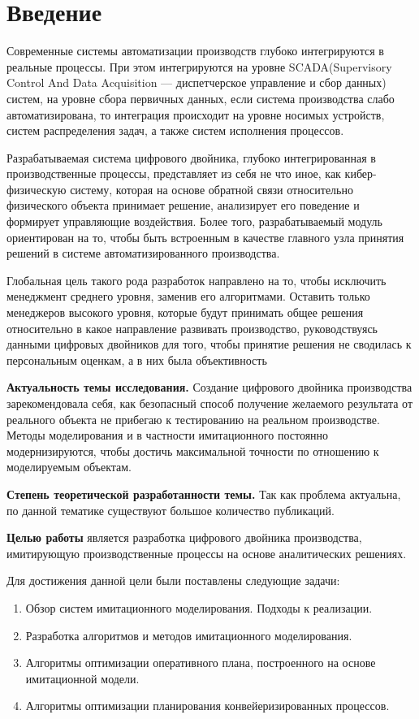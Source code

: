 \section*{Введение}
Современные системы автоматизации производств глубоко интегрируются в реальные процессы. При этом интегрируются на уровне SCADA(Supervisory Control And Data Acquisition — диспетчерское управление и сбор данных) систем, на уровне сбора первичных данных, если система производства слабо автоматизирована, то интеграция происходит на уровне носимых устройств, систем распределения задач, а также систем исполнения процессов. 

Разрабатываемая система цифрового двойника, глубоко интегрированная в производственные процессы, представляет из себя не что иное, как кибер-физическую систему, которая на основе обратной связи относительно физического объекта принимает решение, анализирует его поведение и формирует управляющие воздействия. Более того, разрабатываемый модуль ориентирован на то, чтобы быть встроенным в качестве главного узла принятия решений в системе автоматизированного производства.

Глобальная цель такого рода разработок направлено на то, чтобы исключить менеджмент среднего уровня, заменив его алгоритмами. Оставить только менеджеров высокого уровня, которые будут принимать общее решения относительно в какое направление развивать производство, руководствуясь данными цифровых двойников для того, чтобы принятие решения не сводилась к персональным оценкам, а в них была объективность

\newpage

\textbf{Актуальность темы исследования.} Создание цифрового двойника производства зарекомендовала себя, как безопасный способ получение желаемого результата от реального объекта не прибегаю к тестированию на реальном производстве. Методы моделирования и в частности имитационного постоянно модернизируются, чтобы достичь максимальной точности по отношению к моделируемым объектам.

\textbf{Степень теоретической разработанности темы.} Так как проблема актуальна, по данной тематике существуют большое количество публикаций.

\textbf{Целью работы} является разработка цифрового двойника производства, имитирующую производственные процессы на основе аналитических решениях.

Для достижения данной цели были поставлены следующие задачи:

\begin{enumerate}
    \item Обзор систем имитационного моделирования. Подходы к реализации.
    \item Разработка алгоритмов и методов имитационного моделирования.
    \item Алгоритмы оптимизации оперативного плана, построенного на основе имитационной модели.
    \item Алгоритмы оптимизации планирования конвейеризированных процессов.
\end{enumerate}







